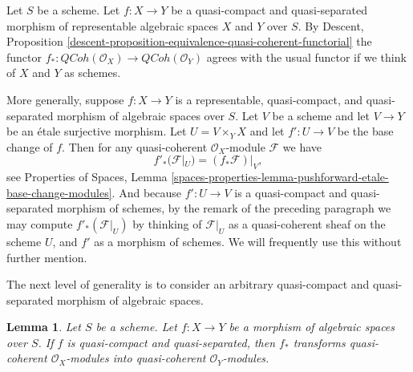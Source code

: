 \documentclass{stacks-project}
\theoremstyle{plain}
\newtheorem{lemma}[subsection]{Lemma}
\theoremstyle{definition}
\theoremstyle{remark}
\numberwithin{equation}{subsection}
\def\QCoh{\mathit{QCoh}}
\begin{document}
\noindent
Let $S$ be a scheme. Let $f : X \to Y$ be a quasi-compact and
quasi-separated morphism of representable algebraic spaces $X$
and $Y$ over $S$. By
Descent,
Proposition \ref{descent-proposition-equivalence-quasi-coherent-functorial}
the functor
$f_* : \QCoh(\mathcal{O}_X) \to \QCoh(\mathcal{O}_Y)$
agrees with the usual functor if we think of $X$ and $Y$ as schemes.

\medskip\noindent
More generally, suppose $f : X \to Y$ is a representable, quasi-compact, and
quasi-separated morphism of algebraic spaces over $S$. Let $V$ be a scheme
and let $V \to Y$ be an \'etale surjective morphism. Let $U = V \times_Y X$
and let $f' : U \to V$ be the base change of $f$. Then for any
quasi-coherent $\mathcal{O}_X$-module $\mathcal{F}$ we have
\begin{equation}
\label{equation-representable-pushforward}
f'_*(\mathcal{F}|_U) = (f_*\mathcal{F})|_V,
\end{equation}
see
Properties of Spaces,
Lemma \ref{spaces-properties-lemma-pushforward-etale-base-change-modules}.
And because $f' : U \to V$ is a quasi-compact and quasi-separated
morphism of schemes, by the remark of the preceding paragraph we may
compute $f'_*(\mathcal{F}|_U)$ by thinking of $\mathcal{F}|_U$ as a
quasi-coherent sheaf on the scheme $U$, and $f'$ as a morphism of schemes.
We will frequently use this without further mention.

\medskip\noindent
The next level of generality is to consider an arbitrary
quasi-compact and quasi-separated morphism of algebraic spaces.

\begin{lemma}
\label{lemma-pushforward}
Let $S$ be a scheme.
Let $f : X \to Y$ be a morphism of algebraic spaces over $S$.
If $f$ is quasi-compact and quasi-separated, then $f_*$ transforms
quasi-coherent $\mathcal{O}_X$-modules into
quasi-coherent $\mathcal{O}_Y$-modules.
\end{lemma}
\end{document}
